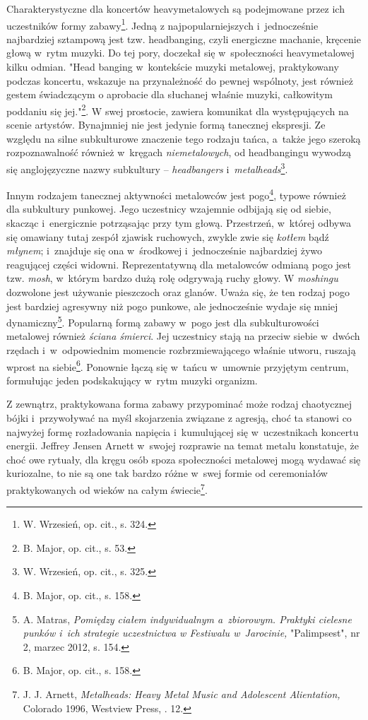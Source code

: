 \documentclass[12pt, a4paper, titlepage]{report}
\begin{document}
Charakterystyczne dla koncertów heavymetalowych są podejmowane przez ich uczestników formy zabawy\footnote{W. Wrzesień, op. cit., s. 324.}. Jedną z najpopularniejszych i~jednocześnie najbardziej sztampową jest tzw. headbanging, czyli energiczne machanie, kręcenie głową w~rytm muzyki. Do tej pory, doczekał się w~społeczności heavymetalowej kilku odmian. "Head banging w~kontekście muzyki metalowej, praktykowany podczas koncertu, wskazuje na przynależność do pewnej wspólnoty, jest również gestem świadczącym o aprobacie dla słuchanej właśnie muzyki, całkowitym poddaniu się jej."\footnote{B. Major, op. cit., s. 53.}. W swej prostocie, zawiera komunikat dla występujących na scenie artystów. Bynajmniej nie jest jedynie formą tanecznej ekspresji. Ze względu na silne subkulturowe znaczenie tego rodzaju tańca, a~także jego szeroką rozpoznawalność również w~kręgach \textit{niemetalowych}, od headbangingu wywodzą się anglojęzyczne nazwy subkultury -- \textit{headbangers} i~\textit{metalheads}\footnote{W. Wrzesień, op. cit., s. 325.}. 

Innym rodzajem tanecznej aktywności metalowców jest pogo\footnote{B. Major, op. cit., s. 158.}, typowe również dla subkultury punkowej. Jego uczestnicy wzajemnie odbijają się od siebie, skacząc i~energicznie potrząsając przy tym głową. Przestrzeń, w~której odbywa się omawiany tutaj zespół zjawisk ruchowych, zwykle zwie się \textit{kotłem} bądź \textit{młynem}; i~znajduje się ona w~środkowej i~jednocześnie najbardziej żywo reagującej części widowni. Reprezentatywną dla metalowców odmianą pogo jest tzw. \textit{mosh}, w~którym bardzo dużą rolę odgrywają ruchy głowy. W \textit{moshingu} dozwolone jest używanie pieszczoch oraz glanów. Uważa się, że ten rodzaj pogo jest bardziej agresywny niż pogo punkowe, ale jednocześnie wydaje się mniej dynamiczny\footnote{A. Matras, \textit{Pomiędzy ciałem indywidualnym a~zbiorowym. Praktyki cielesne punków i~ich strategie uczestnictwa w Festiwalu w~Jarocinie,} "Palimpsest", nr 2, marzec 2012, s. 154.}. Popularną formą zabawy w~pogo jest dla subkulturowości metalowej również \textit{ściana śmierci}. Jej uczestnicy stają na przeciw siebie w~dwóch rzędach i~w~odpowiednim momencie rozbrzmiewającego właśnie utworu, ruszają wprost na siebie\footnote{B. Major, op. cit., s. 158.}. Ponownie łączą się w~tańcu w~umownie przyjętym centrum, formułując jeden podskakujący w~rytm muzyki organizm. 

Z zewnątrz, praktykowana forma zabawy przypominać może rodzaj chaotycznej bójki i~przywoływać na myśl skojarzenia związane z agresją, choć ta stanowi co najwyżej formę rozładowania napięcia i~kumulującej się w~uczestnikach koncertu energii. Jeffrey Jensen Arnett w~swojej rozprawie na temat metalu konstatuje, że choć owe rytuały, dla kręgu osób spoza społeczności metalowej mogą wydawać się kuriozalne, to nie są one tak bardzo różne w~swej formie od ceremoniałów praktykowanych od wieków na całym świecie\footnote{J. J. Arnett,\textit{ Metalheads: Heavy Metal Music and Adolescent Alientation,} Colorado 1996, Westview Press, . 12.}. 
\end{document}
